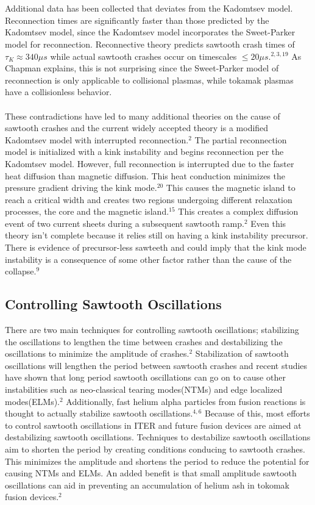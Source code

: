 \documentclass{article}
\begin{document}
\\\\Additional data has been collected that deviates from the Kadomtsev model.  Reconnection times are significantly faster than those predicted by the Kadomtsev model, since the Kadomtsev model incorporates the Sweet-Parker model for reconnection.  Reconnective theory predicts sawtooth crash times of $\tau_K \approx340 \mu s$ while actual sawtooth crashes occur on timescales $\leq20\mu s$.$^{2,3,19}$  As Chapman explains, this is not surprising since the Sweet-Parker model of reconnection is only applicable to collisional plasmas, while tokamak plasmas have a collisionless behavior.\\\\
These contradictions have led to many additional theories on the cause of sawtooth crashes and the current widely accepted theory is a modified Kadomtsev model with interrupted reconnection.$^{2}$  The partial reconnection model is initialized with a kink instability and begins reconnection per the Kadomtsev model.  However, full reconnection is interrupted due to the faster heat diffusion than magnetic diffusion.  This heat conduction minimizes the pressure gradient driving the kink mode.$^{20}$  This causes the magnetic island to reach a critical width and creates two regions undergoing different relaxation processes, the core and the magnetic island.$^{15}$  This creates a complex diffusion event of two current sheets during a subsequent sawtooth ramp.$^{2}$  Even this theory isn't complete because it relies still on having a kink instability precursor.  There is evidence of precursor-less sawteeth and could imply that the kink mode instability is a consequence of some other factor rather than the cause of the collapse.$^{9}$
\subsection{Controlling Sawtooth Oscillations}
There are two main techniques for controlling sawtooth oscillations; stabilizing the oscillations to lengthen the time between crashes and destabilizing the oscillations to minimize the amplitude of crashes.$^{2}$  Stabilization of sawtooth oscillations will lengthen the period between sawtooth crashes and recent studies have shown that long period sawtooth oscillations can go on to cause other instabilities such as neo-classical tearing modes(NTMs) and edge localized modes(ELMs).$^{2}$  Additionally, fast helium alpha particles from fusion reactions is thought to actually stabilize sawtooth oscillations.$^{4,6}$  Because of this, most efforts to control sawtooth oscillations in ITER and future fusion devices are aimed at destabilizing sawtooth oscillations.  Techniques to destabilize sawtooth oscillations aim to shorten the period by creating conditions conducing to sawtooth crashes.  This minimizes the amplitude and shortens the period to reduce the potential for causing NTMs and ELMs.  An added benefit is that small amplitude sawtooth oscillations can aid in preventing an accumulation of helium ash in tokomak fusion devices.$^{2}$
\end{document}
